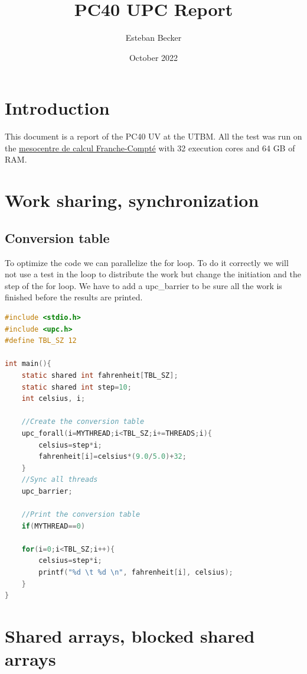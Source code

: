 \documentclass{report}
\title{PC40 UPC Report}
\author{Esteban Becker}
\date{October 2022}
\begin{document}
\maketitle

\tableofcontents

\chapter{Introduction}

This document is a report of the PC40 UV at the UTBM. \newline
All the test was run on the \href{https://www.univ-fcomte.fr/informatique-calcul/mesocentre-de-calcul}{mesocentre de calcul Franche-Compté} with 32 execution cores and 64 GB of RAM.

\chapter{Work sharing, synchronization}

\section{Conversion table}

To optimize the code we can parallelize the for loop. To do it correctly we will not use a test in the loop to distribute the work but change the initiation and the step of the for loop.\newline
We have to add a upc\_barrier to be sure all the work is finished before the results are printed.

\begin{lstlisting}[language=C]
#include <stdio.h>
#include <upc.h>
#define TBL_SZ 12

int main(){
    static shared int fahrenheit[TBL_SZ];
    static shared int step=10; 
    int celsius, i;

    //Create the conversion table
    upc_forall(i=MYTHREAD;i<TBL_SZ;i+=THREADS;i){
        celsius=step*i;
        fahrenheit[i]=celsius*(9.0/5.0)+32;
    }
    //Sync all threads
    upc_barrier;

    //Print the conversion table
    if(MYTHREAD==0)

    for(i=0;i<TBL_SZ;i++){
        celsius=step*i;
        printf("%d \t %d \n", fahrenheit[i], celsius);
    }
}

\end{lstlisting}


\chapter{Shared arrays, blocked shared arrays}
\end{document}
